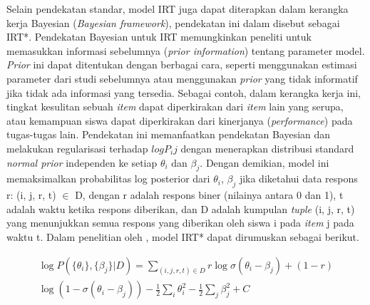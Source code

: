 Selain pendekatan standar, model IRT juga dapat diterapkan dalam
kerangka kerja Bayesian (\textit{Bayesian framework}), pendekatan ini
dalam \textcite{Minn2022} disebut sebagai IRT*. Pendekatan Bayesian untuk IRT
memungkinkan peneliti untuk memasukkan informasi sebelumnya
(\textit{prior information}) tentang parameter model. \textit{Prior} ini
dapat ditentukan dengan berbagai cara, seperti menggunakan estimasi parameter
dari studi sebelumnya atau menggunakan \textit{prior} yang tidak informatif
jika tidak ada informasi yang tersedia. Sebagai
contoh, dalam kerangka kerja ini, tingkat kesulitan sebuah \textit{item}
dapat diperkirakan dari \textit{item} lain yang serupa, atau kemampuan
siswa dapat diperkirakan dari kinerjanya (\textit{performance}) pada tugas-tugas
lain. Pendekatan ini memanfaatkan pendekatan Bayesian dan
melakukan regularisasi terhadap $log P_ij$ dengan menerapkan distribusi
standard \textit{normal prior} independen ke setiap $\theta_i$ dan $\beta_j$.
Dengan demikian, model ini memaksimalkan probabilitas log posterior dari {$\theta_i$, $\beta_j$}
jika diketahui data respons {r: (i, j, r, t) $\in$ D}, dengan r adalah respons biner (nilainya antara 0 dan 1),
t adalah waktu ketika respons diberikan, dan D adalah kumpulan \textit{tuple} (i, j, r, t) yang menunjukkan
semua respons yang diberikan oleh siswa i pada \textit{item} j pada waktu t. Dalam penelitian oleh \textcite{Minn2022},
model IRT* dapat dirumuskan sebagai berikut.

\begin{multline}
\log P(\{\theta_i\}, \{\beta_j\}|D) = \sum_{(i,j,r,t) \in D} r\log \sigma(\theta_i - \beta_j) + (1-r) \\
\log(1 - \sigma(\theta_i - \beta_j)) - \frac{1}{2}\sum_i \theta_i^2 - \frac{1}{2}\sum_j \beta_j^2 + C \label{eq:rumus_irt_star}
\end{multline}


